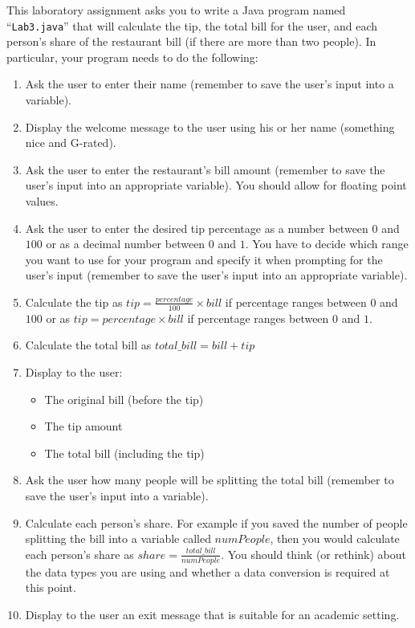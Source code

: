 This laboratory assignment asks you to write a Java program named ``{\tt Lab3.java}'' that will calculate the tip, the
total bill for the user, and each person's share of the restaurant bill (if there are more than two people). In
particular, your program needs to do the following: 
\begin{enumerate}
\item Ask the user to enter their name (remember to save the user's input into a variable).
\item Display the welcome message to the user using his or her name (something nice and G-rated).
\item Ask the user to enter the restaurant's bill amount (remember to save the user's input into an appropriate variable). You should allow for floating point values.
\item Ask the user to enter the desired tip percentage as a number between $0$ and $100$ or as a decimal number between
  $0$ and $1$. You have to decide which range you want to use for your program and specify it when prompting for the user's
  input (remember to save the user's input into an appropriate variable).
\item Calculate the tip as $tip = \frac{percentage}{100} \times bill$ if percentage ranges between $0$ and $100$ or as $tip = percentage \times bill$ if percentage ranges between $0$ and $1$.
\item Calculate the total bill as $total\_bill = bill+tip$
\item Display to the user:
	\begin{itemize}
		\item The original bill (before the tip)
		\item The tip amount
		\item The total bill (including the tip)
	\end{itemize}
\item Ask the user how many people will be splitting the total bill (remember to save the user's input into a variable).
\item Calculate each person's share. For example if you saved the number of people splitting the bill into a variable called $numPeople$, then you would calculate each person's share as $share = \frac{total\_bill}{numPeople}$. You should think (or rethink) about the data types you are using and whether a data conversion is required at this point. 
\item Display to the user an exit message that is suitable for an academic setting.
\end{enumerate}

